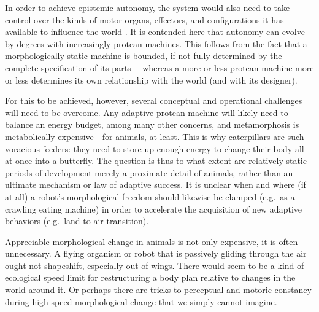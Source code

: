 
In order to achieve epistemic autonomy,
the system would also need to take control over the kinds 
of 
motor organs,
effectors, and
configurations
it has available to influence the world \cite{cariani1993evolve}.
It is contended here that autonomy can evolve by degrees with increasingly protean machines.
This follows from the fact that a morphologically-static machine is bounded, if not fully determined by the complete specification of its parts---%
whereas a more or less protean machine more or less determines its own relationship with the world (and with its designer).



For this to be achieved, however, several conceptual and operational challenges will need to be overcome. 
Any adaptive protean machine will
likely
need to balance an energy budget,
among many other concerns,
and metamorphosis is metabolically expensive---for animals, at least.
This is why caterpillars are such
voracious feeders:
they need to store up enough energy to change their body all at once into a butterfly.
The question is thus to what extent are relatively static periods of development 
merely a proximate detail of animals,
rather than an ultimate mechanism \cite{tinbergen1963aims} or law of adaptive success.
It is unclear
when and where (if at all) a robot's morphological freedom should likewise be clamped (e.g.~as a crawling 
eating machine) in order to accelerate the acquisition of new adaptive behaviors (e.g.~land-to-air transition).

Appreciable 
morphological
change
in animals
is not only expensive, it is often unnecessary.
A flying organism or robot that is passively gliding through the air
ought not shapeshift, especially out of wings.
There would seem to be a kind of ecological speed limit for restructuring a body plan relative to changes in the world around it.
Or perhaps there are tricks to perceptual and motoric constancy during high speed morphological change that we simply cannot imagine.


